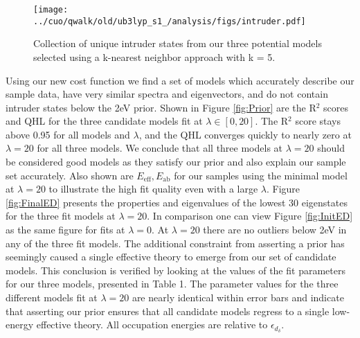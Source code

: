 \documentclass{article}
\begin{document}
\begin{figure}[H]
\begin{center}
\texttt{[image: ../cuo/qwalk/old/ub3lyp\_s1\_/analysis/figs/intruder.pdf]}
\end{center}
\caption{Collection of unique intruder states from our three potential models selected using a k-nearest neighbor approach with k = 5.}
\label{fig:Intruder}
\end{figure}

Using our new cost function we find a set of models which accurately describe our sample data, have very similar spectra and eigenvectors, and do not contain intruder states below the 2eV prior. 
Shown in Figure \ref{fig:Prior} are the R$^2$ scores and QHL for the three candidate models fit at $\lambda \in [0,20]$. 
The R$^2$ score stays above 0.95 for all models and $\lambda$, and the QHL converges quickly to nearly zero at $\lambda = 20$ for all three models. 
We conclude that all three models at $\lambda = 20$ should be considered good models as they satisfy our prior and also explain our sample set accurately. 
Also shown are $E_\text{eff}, E_\text{ab}$ for our samples using the minimal model at $\lambda = 20$ to illustrate the high fit quality even with a large $\lambda$.
Figure \ref{fig:FinalED} presents the properties and eigenvalues of the lowest 30 eigenstates for the three fit models at $\lambda = 20$. 
In comparison one can view Figure \ref{fig:InitED} as the same figure for fits at $\lambda = 0$. 
At $\lambda = 20$ there are no outliers below 2eV in any of the three fit models. 
The additional constraint from asserting a prior has seemingly caused a single effective theory to emerge from our set of candidate models.
This conclusion is verified by looking at the values of the fit parameters for our three models, presented in Table 1.
The parameter values for the three different models fit at $\lambda = 20$ are nearly identical within error bars and indicate that asserting our prior ensures that all candidate models regress to a single low-energy effective theory.
All occupation energies are relative to $\epsilon_{d_\delta}$.
\end{document}
